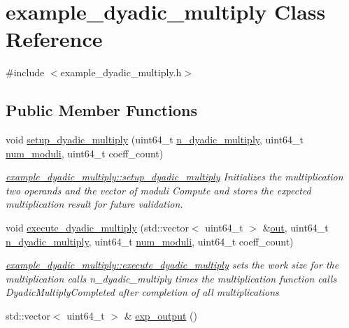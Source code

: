 \hypertarget{classexample__dyadic__multiply}{\section{example\-\_\-dyadic\-\_\-multiply Class Reference}
\label{classexample__dyadic__multiply}
}


{\ttfamily \#include $<$example\-\_\-dyadic\-\_\-multiply.\-h$>$}

\subsection*{Public Member Functions}
\begin{DoxyCompactItemize}
\item 
void \hyperlink{classexample__dyadic__multiply_a0816be553ba8877e38dd37edf5d166be}{setup\-\_\-dyadic\-\_\-multiply} (uint64\-\_\-t \hyperlink{bench__dyadic__multiply_8cpp_a1249f7c009d650067cdc1e2254fcb63c}{n\-\_\-dyadic\-\_\-multiply}, uint64\-\_\-t \hyperlink{bench__dyadic__multiply_8cpp_a94cbf59cad79634589387a30784ed78d}{num\-\_\-moduli}, uint64\-\_\-t coeff\-\_\-count)
\begin{DoxyCompactList}\small\item\em \hyperlink{classexample__dyadic__multiply_a0816be553ba8877e38dd37edf5d166be}{example\-\_\-dyadic\-\_\-multiply\-::setup\-\_\-dyadic\-\_\-multiply} Initializes the multiplication two operands and the vector of moduli Compute and stores the expected multiplication result for future validation. \end{DoxyCompactList}\item 
void \hyperlink{classexample__dyadic__multiply_a1f21e56107b4fc4f522fd59ecc0f3697}{execute\-\_\-dyadic\-\_\-multiply} (std\-::vector$<$ uint64\-\_\-t $>$ \&\hyperlink{bench__dyadic__multiply_8cpp_a9df79bfc3d20b59bcaf8d6721d1b8b82}{out}, uint64\-\_\-t \hyperlink{bench__dyadic__multiply_8cpp_a1249f7c009d650067cdc1e2254fcb63c}{n\-\_\-dyadic\-\_\-multiply}, uint64\-\_\-t \hyperlink{bench__dyadic__multiply_8cpp_a94cbf59cad79634589387a30784ed78d}{num\-\_\-moduli}, uint64\-\_\-t coeff\-\_\-count)
\begin{DoxyCompactList}\small\item\em \hyperlink{classexample__dyadic__multiply_a1f21e56107b4fc4f522fd59ecc0f3697}{example\-\_\-dyadic\-\_\-multiply\-::execute\-\_\-dyadic\-\_\-multiply} sets the work size for the multiplication calls n\-\_\-dyadic\-\_\-multiply times the multiplication function calls Dyadic\-Multiply\-Completed after completion of all multiplications \end{DoxyCompactList}\item 
std\-::vector$<$ uint64\-\_\-t $>$ \& \hyperlink{classexample__dyadic__multiply_a11ae693700a81cd88fdc75be651f2048}{exp\-\_\-output} ()
\end{DoxyCompactItemize}


